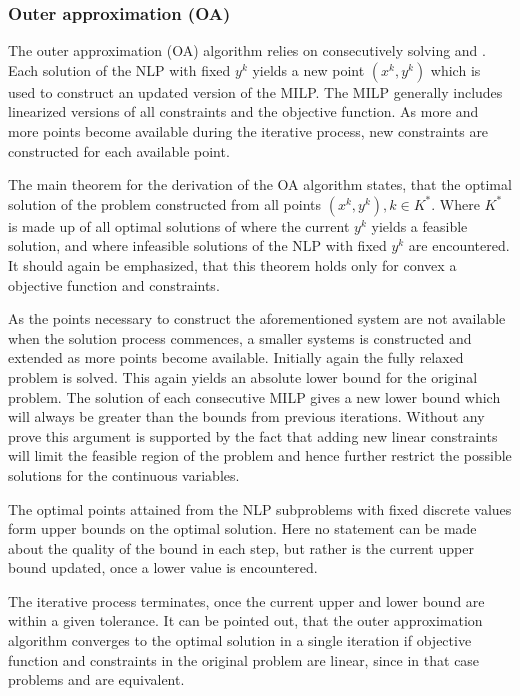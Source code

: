        \subsubsection{Outer approximation (OA)}
        The outer approximation (OA) algorithm relies on consecutively solving  and
        . Each solution of the NLP with fixed $y^k$ yields a new point $(x^k,y^k)$ which is used to
        construct an updated version of the MILP. The MILP generally includes linearized versions of all constraints and
        the objective function. As more and more points become available during the iterative process, new constraints
        are constructed for each available point.

        The main theorem for the derivation of the OA algorithm states, that the optimal solution of the problem
         constructed from all points $(x^k,y^k), k \in K^{\ast}$. Where $K^{\ast}$ is made up of
        all optimal solutions of  where the current $y^k$ yields a feasible solution, and
         where infeasible solutions of the NLP with fixed $y^k$ are encountered. It should
        again be emphasized, that this theorem holds only for convex a objective function and constraints.

        As the points necessary to construct the aforementioned system are not available when the solution process
        commences, a smaller systems is constructed and extended as more points become available. Initially again
        the fully relaxed problem is solved. This again yields an absolute lower bound for the original problem. The solution of each consecutive
        MILP gives a new lower bound which will always be greater than the bounds from previous iterations. Without any
        prove this argument is supported by the fact that adding new linear constraints will limit the feasible region of
        the problem and hence further restrict the possible solutions for the continuous variables.

        The optimal points attained from the NLP subproblems with fixed discrete values form upper bounds on the optimal
        solution. Here no statement can be made about the quality of the bound in each step, but rather is the current
        upper bound updated, once a lower value is encountered.

        The iterative process terminates, once the current upper and lower bound are within a given tolerance. It can be
        pointed out, that the outer approximation algorithm converges to the optimal solution in a single iteration if
        objective function and constraints in the original problem are linear, since in that case problems
         and  are equivalent.

